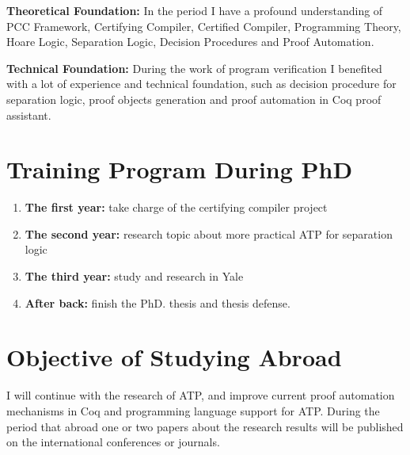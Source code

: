 \documentclass{article}
\begin{document}
  \textbf{Theoretical Foundation:} In the period I have a profound understanding of PCC
  Framework, Certifying Compiler, Certified Compiler, Programming Theory, Hoare Logic, Separation Logic, Decision Procedures and
  Proof Automation. 
    
  \textbf{Technical Foundation:} During the work of program verification I benefited with
  a lot of experience and technical foundation, such as decision procedure for separation logic, 
  proof objects generation and proof automation in Coq proof assistant.
\section{Training Program During PhD}
\label{sec-4}

\begin{enumerate}
\item \textbf{The first year:} take charge of the certifying compiler project
\item \textbf{The second year:} research topic about more practical ATP for separation logic
\item \textbf{The third year:} study and research in Yale
\item \textbf{After back:} finish the PhD. thesis and thesis defense.
\end{enumerate}
\section{Objective of Studying Abroad}
\label{sec-5}

  I will continue with the research of ATP, and improve current proof automation mechanisms in Coq and 
  programming language support for ATP. During the period that abroad one or two papers about the research results will be
  published on the international conferences or journals.
\end{document}
